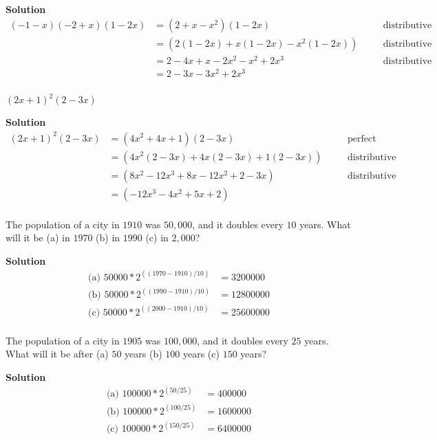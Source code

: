 \textbf{Solution}
\begin{align*}
(-1 - x)(-2 + x)(1 - 2x) &= (2 + x - x^2)(1 - 2x) && \quad \text{distributive} \\
&= (2(1 - 2x) + x(1 - 2x) - x^2(1 - 2x)) && \quad \text{distributive} \\
&= 2 - 4x + x - 2x^2 - x^2 + 2x^3 && \quad \text{distributive} \\
&= 2 - 3x - 3x^2 + 2x^3 && \quad \text{} \\
\end{align*}

\begin{tcolorbox}[title=Problem 29, breakable]
${(2x + 1)}^2(2 - 3x)$
\end{tcolorbox}

\textbf{Solution}
\begin{align*}
{(2x + 1)}^2(2 - 3x) &= (4x^2 +4x + 1)(2 - 3x) && \quad \text{perfect square} \\
&= (4x^2(2 - 3x) + 4x(2 - 3x) + 1(2 - 3x)) && \quad \text{distributive} \\
&= (8x^2 -12x^3 + 8x - 12x^2 + 2 - 3x) && \quad \text{distributive} \\
&= (-12x^3 - 4x^2 + 5x + 2) && \quad \text{} \\
\end{align*}

\begin{tcolorbox}[title=Problem 30, breakable]
The population of a city in $1910$ was $50,000$, and it doubles every $10$
years. What will it be (a) in $1970$ (b) in $1990$ (c) in $2,000$?
\end{tcolorbox}

\textbf{Solution}
\begin{align*}
\text{(a) } 50000 * 2^{((1970-1910) / 10)} &= 3200000 \\
\text{(b) } 50000 * 2^{((1990-1910) / 10)} &= 12800000 \\
\text{(c) } 50000 * 2^{((2000-1910) / 10)} &= 25600000 \\
\end{align*}


\begin{tcolorbox}[title=Problem 31, breakable]
The population of a city in $1905$ was $100,000$, and it doubles every $25$
years. What will it be after (a) $50$ years (b) $100$ years (c) $150$ years?
\end{tcolorbox}

\textbf{Solution}
\begin{align*}
\text{(a) } 100000 * 2^{(50 / 25)} &= 400000 \\
\text{(b) } 100000 * 2^{(100 / 25)} &= 1600000 \\
\text{(c) } 100000 * 2^{(150 / 25)} &= 6400000 \\
\end{align*}

